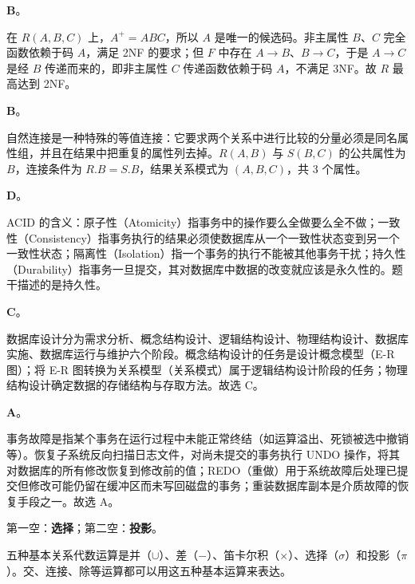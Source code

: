 \documentclass[a4paper,11pt]{article}
\begin{document}
\q \textbf{B}。
\begin{analysis}
在 $R(A,B,C)$ 上，$A^{+}=ABC$，所以 $A$ 是唯一的候选码。非主属性 $B$、$C$ 完全函数依赖于码 $A$，满足 2NF 的要求；但 $F$ 中存在 $A\to B$、$B\to C$，于是 $A\to C$ 是经 $B$ 传递而来的，即非主属性 $C$ 传递函数依赖于码 $A$，不满足 3NF。故 $R$ 最高达到 2NF。
\end{analysis}

\q \textbf{B}。
\begin{analysis}
自然连接是一种特殊的等值连接：它要求两个关系中进行比较的分量必须是同名属性组，并且在结果中把重复的属性列去掉。$R(A,B)$ 与 $S(B,C)$ 的公共属性为 $B$，连接条件为 $R.B=S.B$，结果关系模式为 $(A,B,C)$，共 3 个属性。
\end{analysis}

\q \textbf{D}。
\begin{analysis}
ACID 的含义：原子性（Atomicity）指事务中的操作要么全做要么全不做；一致性（Consistency）指事务执行的结果必须使数据库从一个一致性状态变到另一个一致性状态；隔离性（Isolation）指一个事务的执行不能被其他事务干扰；持久性（Durability）指事务一旦提交，其对数据库中数据的改变就应该是永久性的。题干描述的是持久性。
\end{analysis}

\q \textbf{C}。
\begin{analysis}
数据库设计分为需求分析、概念结构设计、逻辑结构设计、物理结构设计、数据库实施、数据库运行与维护六个阶段。概念结构设计的任务是设计概念模型（E-R 图）；将 E-R 图转换为关系模型（关系模式）属于逻辑结构设计阶段的任务；物理结构设计确定数据的存储结构与存取方法。故选 C。
\end{analysis}

\q \textbf{A}。
\begin{analysis}
事务故障是指某个事务在运行过程中未能正常终结（如运算溢出、死锁被选中撤销等）。恢复子系统反向扫描日志文件，对尚未提交的事务执行 UNDO 操作，将其对数据库的所有修改恢复到修改前的值；REDO（重做）用于系统故障后处理已提交但修改可能仍留在缓冲区而未写回磁盘的事务；重装数据库副本是介质故障的恢复手段之一。故选 A。
\end{analysis}


\q 第一空：\textbf{选择}；第二空：\textbf{投影}。
\begin{analysis}
五种基本关系代数运算是并（$\cup$）、差（$-$）、笛卡尔积（$\times$）、选择（$\sigma$）和投影（$\pi$）。交、连接、除等运算都可以用这五种基本运算来表达。
\end{analysis}
\end{document}
